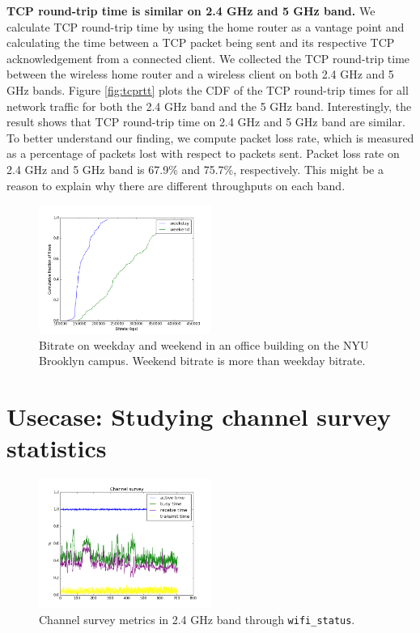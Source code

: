 \textbf{TCP round-trip time is similar on 2.4 GHz and 5 GHz band.} We calculate TCP round-trip time by using the home router as a vantage point and calculating the time between a TCP packet being sent and its respective TCP acknowledgement from a connected client. We collected the TCP round-trip time between the wireless home router and a wireless client on both 2.4 GHz and 5 GHz bands. Figure \ref{fig:tcprtt} plots the CDF of the TCP round-trip times for all network traffic for both the 2.4 GHz band and the 5 GHz band. Interestingly, the result shows that TCP round-trip time on 2.4 GHz and 5 GHz band are similar. To better understand our finding, we compute packet loss rate, which is measured as a percentage of packets lost with respect to packets sent. Packet loss rate on 2.4 GHz and 5 GHz band is 67.9\% and 75.7\%, respectively. This might be a reason to explain why there are different throughputs on each band.

\begin{figure}
\centering
\includegraphics[width=0.5\textwidth]{figure/bitrate(weekday_vs_weekend).png}
\caption{Bitrate on weekday and weekend in an office building on the NYU Brooklyn campus. Weekend bitrate is more than weekday bitrate.}
\label{fig:compare}
\end{figure}

\section{Usecase: Studying channel survey statistics}
\label{sec.usecase2}

\begin{figure}
\centering
\includegraphics[width=0.5\textwidth]{figure/channel.png}
\caption{Channel survey metrics in 2.4 GHz band through \texttt{wifi\_status}.}
\label{fig:channelsurvey}
\end{figure}

